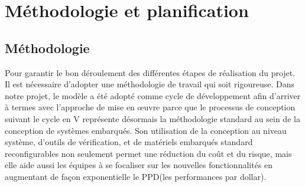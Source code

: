 \section{Méthodologie et planification}
\subsection{Méthodologie}
Pour garantir le bon déroulement des différentes étapes de réalisation du projet. Il est nécessaire d’adopter une méthodologie de travail qui soit rigoureuse.
Dans notre projet, le modèle a été adopté comme cycle de développement afin d’arriver à termes avec l’approche de mise en œuvre parce que le processus de conception suivant le cycle en V représente désormais la méthodologie standard au sein de la conception de systèmes embarqués.
Son utilisation de la conception au niveau système, d’outils de vérification, et de matériels embarqués standard reconfigurables non seulement permet une réduction du coût et du risque, mais elle aide aussi les équipes à se focaliser sur les nouvelles fonctionnalités en augmentant de façon exponentielle le PPD(les performances par dollar).\\

